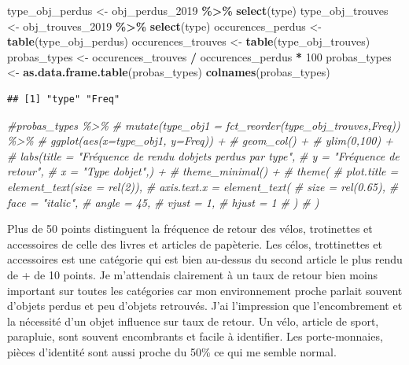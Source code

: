\documentclass[
]{article}
\newenvironment{Shaded}{\begin{snugshade}}{\end{snugshade}}
\newcommand{\CommentTok}[1]{\textcolor[rgb]{0.56,0.35,0.01}{\textit{#1}}}
\newcommand{\DecValTok}[1]{\textcolor[rgb]{0.00,0.00,0.81}{#1}}
\newcommand{\FunctionTok}[1]{\textcolor[rgb]{0.13,0.29,0.53}{\textbf{#1}}}
\newcommand{\NormalTok}[1]{#1}
\newcommand{\OtherTok}[1]{\textcolor[rgb]{0.56,0.35,0.01}{#1}}
\newcommand{\SpecialCharTok}[1]{\textcolor[rgb]{0.81,0.36,0.00}{\textbf{#1}}}
\begin{document}
\begin{Shaded}
\begin{Highlighting}[]
\NormalTok{type\_obj\_perdus }\OtherTok{\textless{}{-}}\NormalTok{ obj\_perdus\_2019 }\SpecialCharTok{\%\textgreater{}\%}
  \FunctionTok{select}\NormalTok{(type)}
\NormalTok{type\_obj\_trouves }\OtherTok{\textless{}{-}}\NormalTok{ obj\_trouves\_2019 }\SpecialCharTok{\%\textgreater{}\%}
  \FunctionTok{select}\NormalTok{(type)}
\NormalTok{occurences\_perdus }\OtherTok{\textless{}{-}} \FunctionTok{table}\NormalTok{(type\_obj\_perdus)}
\NormalTok{occurences\_trouves }\OtherTok{\textless{}{-}} \FunctionTok{table}\NormalTok{(type\_obj\_trouves)}
\NormalTok{probas\_types }\OtherTok{\textless{}{-}}\NormalTok{ occurences\_trouves }\SpecialCharTok{/}\NormalTok{ occurences\_perdus }\SpecialCharTok{*} \DecValTok{100}
\NormalTok{probas\_types }\OtherTok{\textless{}{-}} \FunctionTok{as.data.frame.table}\NormalTok{(probas\_types)}
\FunctionTok{colnames}\NormalTok{(probas\_types)}
\end{Highlighting}
\end{Shaded}

\begin{verbatim}
## [1] "type" "Freq"
\end{verbatim}

\begin{Shaded}
\begin{Highlighting}[]
\CommentTok{\#probas\_types \%\textgreater{}\% }
\CommentTok{\#  mutate(type\_obj1 = fct\_reorder(type\_obj\_trouves,Freq)) \%\textgreater{}\%}
\CommentTok{\#  ggplot(aes(x=type\_obj1, y=Freq)) +}
\CommentTok{\#  geom\_col() + }
\CommentTok{\#  ylim(0,100) +}
\CommentTok{\#  labs(title = "Fréquence de rendu d\textquotesingle{}objets perdus par type",}
\CommentTok{\#       y = "Fréquence de retour",}
\CommentTok{\#       x = "Type d\textquotesingle{}objet",) +}
\CommentTok{\#  theme\_minimal() +}
\CommentTok{\#  theme(}
\CommentTok{\#    plot.title = element\_text(size = rel(2)),}
\CommentTok{\#    axis.text.x = element\_text(}
\CommentTok{\#      size = rel(0.65),}
\CommentTok{\#      face = "italic",}
\CommentTok{\#      angle = 45,}
\CommentTok{\#      vjust = 1,}
\CommentTok{\#      hjust = 1}
\CommentTok{\#    )}
\CommentTok{\#  )}
\end{Highlighting}
\end{Shaded}

Plus de 50 points distinguent la fréquence de retour des vélos,
trotinettes et accessoires de celle des livres et articles de papèterie.
Les célos, trottinettes et accessoires est une catégorie qui est bien
au-dessus du second article le plus rendu de + de 10 points. Je
m'attendais clairement à un taux de retour bien moins important sur
toutes les catégories car mon environnement proche parlait souvent
d'objets perdus et peu d'objets retrouvés. J'ai l'impression que
l'encombrement et la nécessité d'un objet influence sur taux de retour.
Un vélo, article de sport, parapluie, sont souvent encombrants et facile
à identifier. Les porte-monnaies, pièces d'identité sont aussi proche du
50\% ce qui me semble normal.
\end{document}
